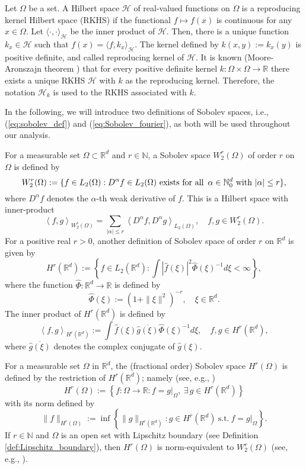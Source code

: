 \documentclass[11pt]{article}
\theoremstyle{remark}
\theoremstyle{example}
\theoremstyle{remark}
\renewcommand{\H}{{\mathcal{H}}}
\newcommand{\N}{\mathbb{N}}
\newcommand{\R}{\mathbb{R}}
\newcommand{\citep}{\cite}
\newcommand{\citealp}{\cite}
\begin{document}
Let $\Omega$ be a set.  
A Hilbert space $\H$ of real-valued functions on $\Omega$ is a reproducing kernel Hilbert space (RKHS) if the functional $f\mapsto f(x)$ is continuous for any $x\in\Omega$.  
Let $\langle\cdot,\cdot\rangle_\H$ be the inner product of $\H$.  Then, there is a unique function $k_x\in\H$ such that $f(x)=\langle f,k_x\rangle_\H$.  The kernel defined by $k(x,y):=k_x(y)$ is positive definite, and called reproducing kernel of $\H$.  It is known  
(Moore-Aronszajn theorem \citep{Aronszajn1950}) that for every positive definite kernel $k: \Omega \times \Omega \to \R$ there exists a unique RKHS $\H$ with $k$ as the reproducing kernel. Therefore, the notation $\H_k$ is used to the RKHS associated with $k$.

In the following, we will introduce two definitions of Sobolev spaces, i.e., (\ref{eq:sobolev_def}) and (\ref{eq:Sobolev_fourier}), as both will be used throughout our analysis.

For a measurable set $\Omega \subset \R^d$ and $r \in \mathbb{N}$, a Sobolev space $W_2^r(\Omega)$ of order $r$ on $\Omega$ is defined by 
\begin{equation} \label{eq:sobolev_def}
W_2^r(\Omega)  := \{ f \in L_2(\Omega): D^\alpha f  \in L_2(\Omega)\ {\rm exists\,\,for\,\,all\,}\ \alpha \in \N_0^d\ {\rm with}\ | \alpha | \leq r \},
\end{equation}
where  $D^\alpha f$ denotes the $\alpha$-th weak derivative of $f$. This is a Hilbert space with inner-product 
\[ \left<f, g  \right>_{W_2^r(\Omega)} = \sum_{ |\alpha | \leq r} \left< D^\alpha f, D^\alpha g \right>_{L_2(\Omega)}, \quad f, g \in W_2^r(\Omega).\]
For a positive real $r > 0$, another definition of Sobolev space of order $r$ on $\R^d$ is given by 
\begin{equation} \label{eq:Sobolev_fourier}
H^r(\R^d) := \left\{ f \in L_2(\R^d): \int  |\hat{f}(\xi)|^2  \hat{\Phi}(\xi)^{-1} d\xi < \infty \right\},
\end{equation}
where the function $\hat{\Phi}: \R^d \to \R$ is defined by
\[ 
\hat{\Phi}(\xi) := (1 + \| \xi \|^2 )^{-r}, \quad \xi \in \R^d. 
\]
The inner product of $H^r(\R^d)$ is defined by 
\[
\left< f, g \right>_{H^r(\R^d)} :=  \int   \hat{f}(\xi) \overline{\hat{g}(\xi)}\hat{\Phi}(\xi)^{-1} d\xi , \quad f,g \in H^r(\R^d),
\]
where $\overline{\hat{g}(\xi)}$ denotes the complex conjugate of $\hat{g} (\xi) $.

For a measurable set $\Omega$ in $\R^d$, the (fractional order) Sobolev space $H^r(\Omega)$ is defined by the restriction of $H^r(\R^d)$; namely (see, e.g., \citealp[Eq.~(1.8) and Definition 4.10]{Tri06})
\[
H^r(\Omega) := \left\{ f: \Omega \to \R: f = g|_\Omega,\ \exists\, g \in H^r(\R^d)  \right\}
\]
with its norm defined by
\[
\| f \|_{H^r(\Omega)} := \inf \left\{ \| g \|_{H^r(\R^d)}: g \in H^r(\R^d)\ \text{s.t.}\ f = g|_\Omega  \right\}.
\]
If $r \in \mathbb{N}$ and $\Omega$ is an open set with Lipschitz boundary (see Definition \ref{def:Lipschitz_boundary}), then $H^r(\Omega)$ is norm-equivalent to $W_2^r(\Omega)$ (see, e.g., \citealp[Eqs.~(1.8), (4.20)]{Tri06}).
\end{document}
